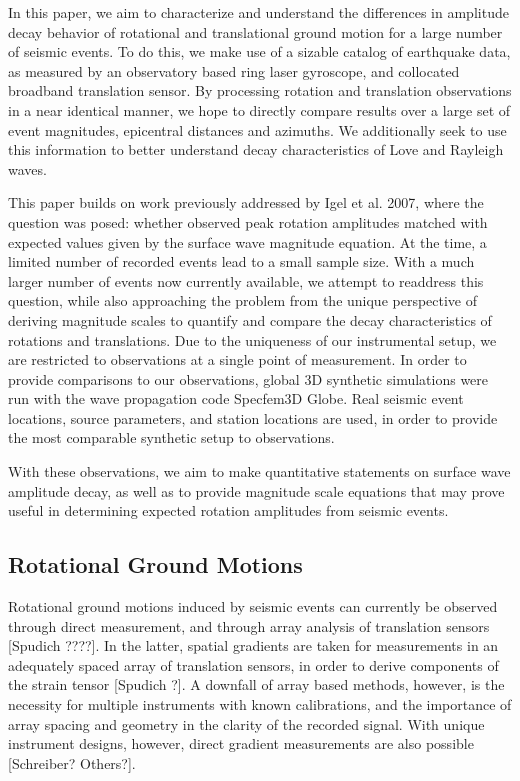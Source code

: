 \documentclass{gji}
\begin{document}
In this paper, we aim to characterize and understand the differences in amplitude decay behavior of rotational and translational ground motion for a large number of seismic events. To do this, we make use of a sizable catalog of earthquake data, as measured by an observatory based ring laser gyroscope, and collocated broadband translation sensor. By processing rotation and translation observations in a near identical manner, we hope to directly compare results over a large set of event magnitudes, epicentral distances and  azimuths. We additionally seek to use this information to better understand decay characteristics of Love and Rayleigh waves.

This paper builds on work previously addressed by Igel et al. 2007, %
where the question was posed: whether observed peak rotation amplitudes matched with expected values given by the surface wave magnitude equation. At the time, a limited number of recorded events lead to a small sample size. With a much larger number of events now currently available, we attempt to readdress this question, while also approaching the problem from the unique perspective of deriving magnitude scales to quantify and compare the decay characteristics of rotations and translations. Due to the uniqueness of our instrumental setup, we are restricted to observations at a single point of measurement. In order to provide comparisons to our observations, global 3D synthetic simulations were run with the wave propagation code Specfem3D Globe. Real seismic event locations, source parameters, and station locations are used, in order to provide the most comparable synthetic setup to observations. 

With these observations, we aim to make quantitative statements on surface wave amplitude decay, as well as to provide magnitude scale equations that may prove useful in determining expected rotation amplitudes from seismic events.

\subsection{Rotational Ground Motions}
Rotational ground motions induced by seismic events can currently be observed through direct measurement, and through array analysis of translation sensors [Spudich ????].
In the latter, spatial gradients are taken for measurements in an adequately spaced array of translation sensors, in order to derive components of the strain tensor [Spudich ?]. A downfall of array based methods, however, is the necessity for multiple instruments with known calibrations, and the importance of array spacing and geometry in the clarity of the recorded signal. With unique instrument designs, however, direct gradient measurements are also possible [Schreiber? Others?]. %
\end{document}
